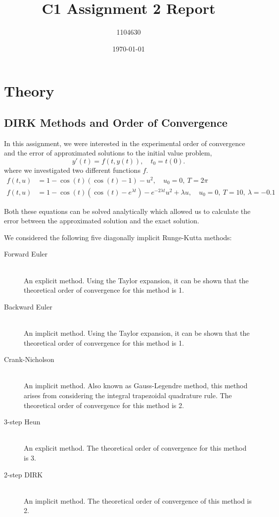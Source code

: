 \documentclass[letterpaper,12pt]{article}
\begin{document}
\title{C1 Assignment 2 Report}
\author{1104630}
\date{\today}
\maketitle


\section{Theory}

\subsection{DIRK Methods and Order of Convergence}

In this assignment, we were interested in the experimental order of convergence and the error of approximated solutions to the initial value problem,
\[
y'(t) = f(t, y(t)), \quad	 t_0 = t(0).
\]
where we investigated two different functions $f$.
\begin{align}
f(t, u) &= 1 - \cos(t)(\cos(t) - 1) - u^2, \quad u_0 = 0, \: T= 2\pi \\ 
f(t, u) &= 1 - \cos(t)(\cos(t) - e^{\lambda t}) - e^{-2 \lambda t}u^2 + \lambda u, \quad u_0 = 0, \: T = 10, \: \lambda = -0.1
\end{align}

Both these equations can be solved analytically which allowed us to calculate the error between the approximated solution and the exact solution.

We considered the following five diagonally implicit Runge-Kutta methods:

\begin{description}
	\item[Forward Euler] \hfill \\
		An explicit method. Using the Taylor expansion, it can be shown that the theoretical order of convergence for this method is 1.
		
	\item[Backward Euler] \hfill \\
		An implicit method. Using the Taylor expansion, it can be shown that the theoretical order of convergence for this method is 1.
		
	\item[Crank-Nicholson] \hfill \\
		An implicit method. Also known as Gauss-Legendre method, this method arises from considering the integral trapezoidal quadrature rule. The theoretical order of convergence for this method is 2.
	
	\item[3-step Heun] \hfill \\
		An explicit method. The theoretical order of convergence for this method is 3. 
		
	\item[2-step DIRK] \hfill \\
		An implicit method. The theoretical order of convergence of this method is 2.
		
\end{description}
\end{document}
